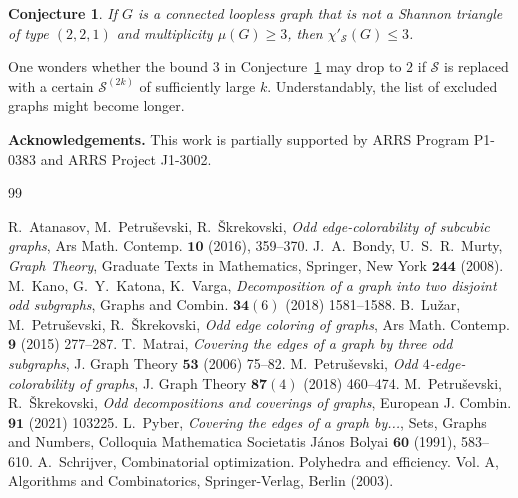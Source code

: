 \documentclass[a4paper,12pt]{article}
\newtheorem{conjecture}[theorem]{Conjecture}
\numberwithin{equation}{section}
\begin{document}
\begin{conjecture}
    \label{conj:3}
If $G$ is a connected loopless graph that is not a Shannon triangle of type $(2,2,1)$ and multiplicity $\mu(G)\geq3$, then $\chi'_{\mathcal{S}}(G)\leq3$.
\end{conjecture}

One wonders whether the bound $3$ in Conjecture~\ref{conj:3} may drop to $2$ if $\mathcal{S}$ is replaced  with a certain $\mathcal{S}^{(2k)}$ of sufficiently large $k$. Understandably, the list of excluded graphs might become longer.







\bigskip
\noindent
{\bf Acknowledgements.}
This work is partially supported by ARRS Program P1-0383 and ARRS Project J1-3002.




\begin{thebibliography}{99}

 R.~Atanasov, M.~Petru\v{s}evski, R.~\v{S}krekovski, \textit{Odd edge-colorability of subcubic graphs}, Ars Math. Contemp. $\mathbf{10}$ (2016), 359--370.
 J.~A.~Bondy, U.~S.~R.~Murty, \textit{Graph Theory}, Graduate Texts in Mathematics, Springer, New York $\mathbf{244}$ (2008).
 M.~Kano, G.~Y.~Katona, K.~Varga, \textit{Decomposition of a graph into two disjoint odd subgraphs}, Graphs and Combin. $\mathbf{34}(6)$ (2018) 1581--1588.
 B.~Lu\v{z}ar, M.~Petru\v{s}evski, R.~\v{S}krekovski, \textit{Odd edge coloring of graphs}, Ars Math. Contemp. $\mathbf{9}$ (2015)  277--287.
 T.~Matrai, \textit{Covering the edges of a graph by three odd subgraphs}, J. Graph Theory $\mathbf{53}$ (2006) 75--82.
 M.~Petru\v{s}evski, \textit{Odd $4$-edge-colorability of graphs}, J. Graph Theory $\mathbf{87}(4)$ (2018) 460--474.
 M.~Petru\v{s}evski, R.~\v{S}krekovski, \textit{Odd decompositions and coverings of graphs}, European J. Combin. $\mathbf{91}$ (2021) 103225.
 L.~Pyber, \textit{Covering the edges of a graph by...}, Sets, Graphs and Numbers, Colloquia Mathematica Societatis J\'{a}nos Bolyai $\mathbf{60}$ (1991), 583--610.
 A.~Schrijver, Combinatorial optimization. {P}olyhedra and efficiency. {V}ol. {A}, Algorithms and Combinatorics, Springer-Verlag, Berlin (2003).



\end{thebibliography}
\end{document}
